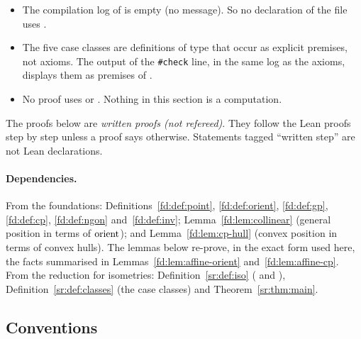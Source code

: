 \begin{itemize}
check also follows definitions. So these two lemmas depend on no
further axiom either.
\item The compilation log  of  is empty
(no message). So no declaration of the file uses .
\item The five case classes are definitions of type  that occur as explicit premises, not axioms. The
output of the \texttt{\#check} line, in the same log as the axioms, displays them as premises of
.
\item No proof uses  or . Nothing in this section is a computation.
\end{itemize}
The proofs below are \emph{written proofs (not refereed)}. They follow the Lean proofs step by step unless a proof says
otherwise. Statements tagged ``written step'' are not Lean declarations.

\paragraph{Dependencies.}
From the foundations: Definitions~\ref{fd:def:point}, \ref{fd:def:orient}, \ref{fd:def:gp}, \ref{fd:def:cp},
\ref{fd:def:ngon} and~\ref{fd:def:inv}; Lemma~\ref{fd:lem:collinear} (general position in terms of $\operatorname{orient}$); and
Lemma~\ref{fd:lem:cp-hull} (convex position in terms of convex hulls). The lemmas below re-prove, in the exact form
used here, the facts summarised in Lemmas~\ref{fd:lem:affine-orient} and~\ref{fd:lem:affine-cp}. From the reduction
for isometries: Definition~\ref{sr:def:iso} ( and ),
Definition~\ref{sr:def:classes} (the case classes) and Theorem~\ref{sr:thm:main}.

\subsection{Conventions}

